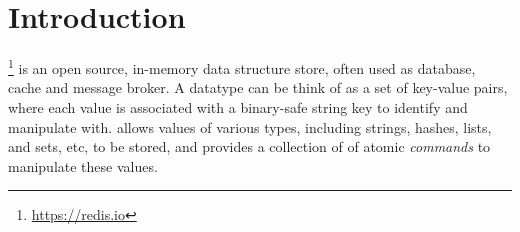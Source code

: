 \newcommand{\framedhslinecorrect}[2]%
  {#1[#2]}

\newcommand{\framedhs}{\sethscode{framedhscode}}


\newenvironment{inlinehscode}%
  {\(\def\column##1##2{}%
   \let\>\undefined\let\<\undefined\let\\\undefined
   \newcommand\>[1][]{}\newcommand\<[1][]{}\newcommand\\[1][]{}%
   \def\fromto##1##2##3{##3}%
   \def\nextline{}}{\) }%

\newcommand{\inlinehs}{\sethscode{inlinehscode}}


\newenvironment{joincode}%
  {\let\orighscode=\hscode
   \let\origendhscode=\endhscode
   \def\endhscode{\def\hscode{\endgroup\def\@currenvir{hscode}\\}\begingroup}
   \orighscode\def\hscode{\endgroup\def\@currenvir{hscode}}}%
  {\origendhscode
   \global\let\hscode=\orighscode
   \global\let\endhscode=\origendhscode}%

\makeatother
\EndFmtInput
%

%
\makeatletter

\let\Varid\mathit
\let\Conid\mathsf

\def\commentbegin{\quad\{\ }
\def\commentend{\}}

\newcommand{\ty}[1]{\Conid{#1}}
\newcommand{\con}[1]{\Conid{#1}}
\newcommand{\id}[1]{\Varid{#1}}
\newcommand{\cl}[1]{\Varid{#1}}
\newcommand{\opsym}[1]{\mathrel{#1}}

\newcommand\Keyword[1]{\textbf{\textsf{#1}}}
\newcommand\Hide{\mathbin{\downarrow}}
\newcommand\Reveal{\mathbin{\uparrow}}




\makeatother
\EndFmtInput

\section{Introduction}
\label{sec:introduction}

\Redis{}\footnote{\url{https://redis.io}} is an open source, in-memory data structure store, often used as database, cache and message broker. A \Redis{} datatype can be think of as a set of key-value pairs, where each value is associated with a binary-safe string key to identify and manipulate with.
\Redis{} allows values of various types, including strings, hashes, lists, and sets, etc, to be stored, and provides a collection of of atomic \emph{commands} to manipulate these values.

